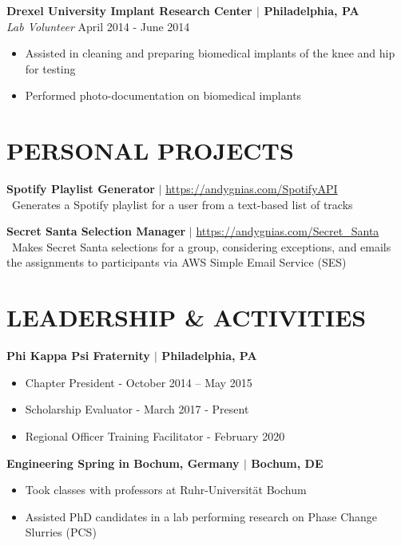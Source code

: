 \documentclass[line,resmargin,11pt]{res}
\begin{document}
\begin{resume}
\textbf{Drexel University Implant Research Center $|$ Philadelphia, PA} \\
{\sl Lab Volunteer} \hfill April 2014 - June 2014 \\
\begin{itemize} \itemsep -2pt
	\item  Assisted in cleaning and preparing biomedical implants of the knee and hip for testing
	\item  Performed photo-documentation on biomedical implants
\end{itemize}
				
\section{PERSONAL PROJECTS}

\textbf{Spotify Playlist Generator} $|$ \url{https://andygnias.com/SpotifyAPI} \\
\textbullet\ Generates a Spotify playlist for a user from a text-based list of tracks

\textbf{Secret Santa Selection Manager} $|$ \url{https://andygnias.com/Secret_Santa} \\
\textbullet\ Makes Secret Santa selections for a group, considering exceptions, and emails the assignments to participants via AWS Simple Email Service (SES)
		
\section{LEADERSHIP \& ACTIVITIES}
				\textbf{Phi Kappa Psi Fraternity $|$ Philadelphia, PA} \\
				\begin{itemize} \itemsep -2pt
				\item  Chapter President - October 2014 – May 2015
				\item Scholarship Evaluator - March 2017 - Present
				\item  Regional Officer Training Facilitator - February 2020
				\end{itemize}
				
				\textbf{Engineering Spring in Bochum, Germany  $|$ Bochum, DE} \\
				\begin{itemize} \itemsep -2pt
				\item  Took classes with professors at Ruhr-Universität Bochum
				\item Assisted PhD candidates in a lab performing research on Phase Change Slurries (PCS)
				\end{itemize}

\end{resume}
\end{document}
